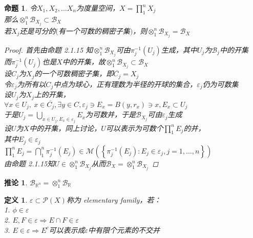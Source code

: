 \documentclass[12pt, a4paper, oneside]{ctexbook}
\newtheorem{definition}[theorem]{定义}
\newtheorem{corollary}[theorem]{推论}
\newtheorem{proposition}[theorem]{命题}
\begin{document}
\begin{proposition}
    令$X_1,X_2,\dots X_n$为度量空间，$X=\prod_1^n X_j$\\
    那么$\otimes_1^n\mathcal{B}_{X_j}\subset\mathcal{B}_X$\\
    若$X_j$还是可分的$($有一个可数的稠密子集$)$，则$\otimes_1^n\mathcal{B}_{X_j}=\mathcal{B}_X$
    \begin{proof}
        首先由命题 2.1.15 知$\otimes_1^n\mathcal{B}_{X_j}$可由$\pi_{j}^{-1}(U_j)$生成，其中$U_j$为$\mathcal{B}_j$中的开集\\
        而$\pi_j^{-1}(U_j)$也是$X$中的开集，故$\otimes_1^n\mathcal{B}_{X_j}\subset\mathcal{B}_{X}$\\
        设$C_j$为$X_j$的一个可数稠密子集，即$\overline{C_j}=X_j$\\
        令$\varepsilon_j$为所有以$C_j$中点为球心，正有理数为半径的开球的集合，$\varepsilon_j$仍为可数集\\
        设$U_j$为$X_j$上的开集，\\
        $\forall x\in U_j,\ x\in\overline{C_j},\exists y\in C,\varepsilon_j\ni E_x=B(y,r_x)\ni x,E_x\subset U_j$\\
        于是$U_j=\bigcup_{x\in U_j,E_x\in\varepsilon_j}E_x$为可数并，于是$\mathcal{B}_{X_j}$可由$\varepsilon_j$生成\\
        设$U$为$X$中的开集，同上讨论，$U$可以表示为可数个$\prod_1^nE_j$的并，\\
        其中$E_j\in\varepsilon_j$\\
        $\prod_1^nE_j=\bigcap_1^n\pi_j^{-1}(E_j)\in\mathcal{M}(\left\{\pi_j^{-1}(E_j):E_j\in\varepsilon_j,j=1,\dots,n\right\})$\\
        由命题 2.1.15知$U\in\otimes_1^n\mathcal{B}_{X_j}$从而$\mathcal{B}_{X}=\otimes_1^n\mathcal{B}_{X_j}$
    \end{proof}
\end{proposition}
\begin{corollary}
    $\mathcal{B}_{\mathbb{R}^n}=\otimes_1^n\mathcal{B}_{\mathbb{R}}$
\end{corollary}
\begin{definition}
    $\varepsilon\subset\mathcal{P}(X)$称为 elementary family，若：\\
    1. $\phi\in\varepsilon$\\
    2. $E,F\in\varepsilon\Rightarrow E\cap F\in\varepsilon$\\
    3. $E\in\varepsilon\Rightarrow E^c$可以表示成$\varepsilon$中有限个元素的不交并
\end{definition}
\end{document}
